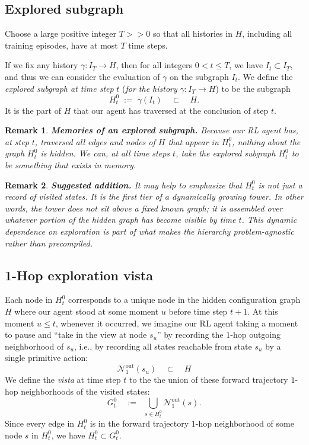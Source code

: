 \documentclass[11pt]{article}
\newtheorem{remark}{Remark}[subsection]
\begin{document}
\subsection{Explored subgraph}
Choose a large positive integer $T>\!\!>0$ so that all histories in $H$, including all training episodes, have at most $T$ time steps. 

If we fix any history $\gamma:I_{T}\longrightarrow H$, then for all integers $0<t\le T$, we have $I_{t}\subset I_{T}$, and thus we can consider the evaluation of $\gamma$ on the subgraph $I_{t}$. We define the {\em explored subgraph at time step} $t$ ({\em for the history $\gamma:I_{T}\longrightarrow H$}) to be the subgraph
$$
H^{0}_{t}\;:=\;\gamma(I_{t})\quad\subset\quad H.
$$
It is the part of $H$ that our agent has traversed at the conclusion of step $t$.

\begin{remark}
{\bf Memories of an explored subgraph.}
\normalfont
Because our RL agent has, at step $t$, traversed all edges and nodes of $H$ that appear in $H^{0}_{t}$, nothing about the graph $H^{0}_{t}$ is hidden. We can, at all time steps $t$, take the explored subgraph $H^{0}_{t}$ to be something that exists in memory.
\end{remark}

{\color{blue}
\begin{remark}
{\bf Suggested addition.}
\normalfont
It may help to emphasize that $H^{0}_{t}$ is not just a record of visited states. It is the first tier of a dynamically growing tower. In other words, the tower does not sit above a fixed known graph; it is assembled over whatever portion of the hidden graph has become visible by time $t$. This dynamic dependence on exploration is part of what makes the hierarchy problem-agnostic rather than precompiled.
\end{remark}
}

\subsection{1-Hop exploration vista}
Each node in $H^{0}_{t}$ corresponds to a unique node in the hidden configuration graph $H$ where our agent stood at some moment $u$ before time step $t+1$. At this moment $u\le t$, whenever it occurred, we imagine our RL agent taking a moment to pause and ``take in the view at node $s_{u}$'' by recording the $1$-hop outgoing neighborhood of $s_{u}$, i.e., by recording all states reachable from state $s_{u}$ by a single primitive action:
$$
\mathcal{N}^{\text{out}\!}_{1}(s_{u})\quad\subset\quad H
$$
We define the {\em vista} at time step $t$ to the the union of these forward trajectory $1$-hop neighborhoods of the visited states:
$$
G^{0}_{t}
\quad:=\;\;
\bigcup_{s\in H^{0}_{t}}\!\mathcal{N}^{\text{out}\!}_{1}(s).
$$
Since every edge in $H^{0}_{t}$ is in the forward trajectory $1$-hop neighborhood of some node $s$ in $H^{0}_{t}$, we have $H^{0}_{t}\subset G^{0}_{t}$.
\end{document}

